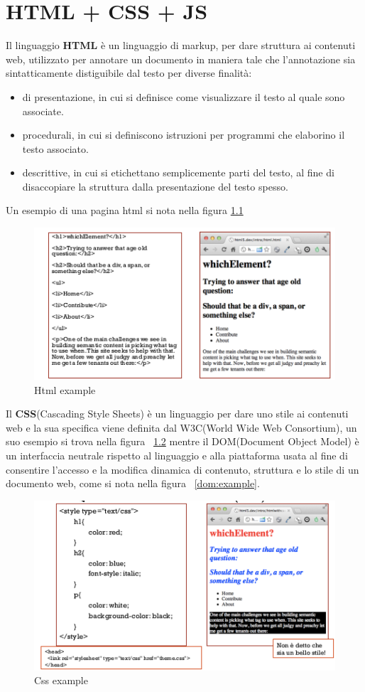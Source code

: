\documentclass[a4paper,12pt, oneside]{book}
\begin{document}
\chapter{HTML + CSS + JS}
Il linguaggio \textbf{HTML} è un linguaggio di markup, per dare struttura ai contenuti web,
utilizzato per annotare un documento in maniera tale che l'annotazione sia sintatticamente
distiguibile dal testo per diverse finalità:
\begin{itemize}
    \item di presentazione, in cui si definisce come visualizzare il testo al quale sono associate.
    \item procedurali, in cui si definiscono istruzioni per programmi che elaborino il testo associato.
    \item descrittive, in cui si etichettano semplicemente parti del testo, 
        al fine di disaccopiare la struttura dalla presentazione del testo spesso.
\end{itemize}
Un esempio di una pagina html si nota nella figura \ref{listato:htmlExample}

\begin{figure}
    \caption{Html example}
    \label{listato:htmlExample}
	\includegraphics[scale=0.9]{img/html.png}
\end{figure}
Il \textbf{CSS}(Cascading Style Sheets) è un linguaggio per dare uno stile ai contenuti web e la sua specifica
viene definita dal W3C(World Wide Web Consortium), un suo esempio si trova nella figura ~\ref{css:example}
mentre il DOM(Document Object Model) è un interfaccia neutrale rispetto al linguaggio e alla piattaforma
usata al fine di consentire l'accesso e la modifica dinamica di contenuto, struttura e lo stile di un
documento web, come si nota nella figura ~\ref{dom:example}.

\begin{figure}
    \caption{Css example}
    \label{css:example}
	\includegraphics[scale=0.9]{img/css.png}
\end{figure}
\end{document}
